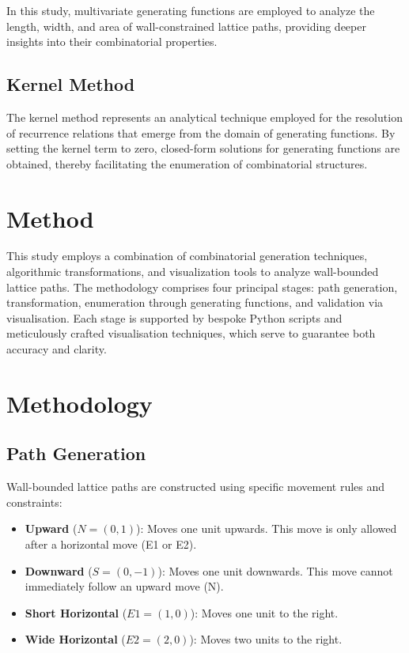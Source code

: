 \documentclass{article}
\begin{document}
In this study, multivariate generating functions are employed to analyze the length, width, and area of wall-constrained lattice paths, providing deeper insights into their combinatorial properties.

\subsection{Kernel Method}
The kernel method represents an analytical technique employed for the resolution of recurrence relations that emerge from the domain of generating functions. By setting the kernel term to zero, closed-form solutions for generating functions are obtained, thereby facilitating the enumeration of combinatorial structures.


\section{Method}

This study employs a combination of combinatorial generation techniques, algorithmic transformations, and visualization tools to analyze wall-bounded lattice paths. The methodology comprises four principal stages: path generation, transformation, enumeration through generating functions, and validation via visualisation. Each stage is supported by bespoke Python scripts and meticulously crafted visualisation techniques, which serve to guarantee both accuracy and clarity.

\section{Methodology}

\subsection{Path Generation}
Wall-bounded lattice paths are constructed using specific movement rules and constraints:

\begin{itemize}
    \item \textbf{Upward} ($N = (0,1)$): Moves one unit upwards. This move is only allowed after a horizontal move (E1 or E2).
    \item \textbf{Downward} ($S = (0,-1)$): Moves one unit downwards. This move cannot immediately follow an upward move (N).
    \item \textbf{Short Horizontal} ($E1 = (1,0)$): Moves one unit to the right.
    \item \textbf{Wide Horizontal} ($E2 = (2,0)$): Moves two units to the right.
\end{itemize}
\end{document}
